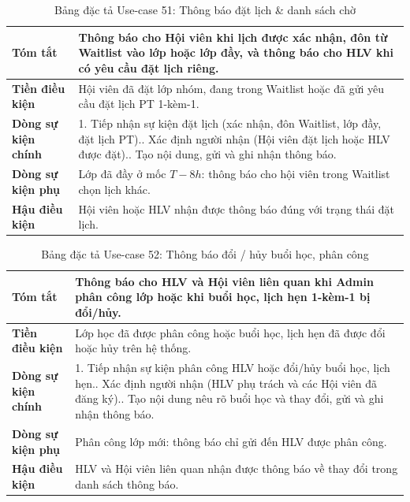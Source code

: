 \documentclass[a4paper,12pt]{article}
\begin{document}
\begin{table}[H]\centering\footnotesize
\begin{tabularx}{\textwidth}{|L{3.2cm}|Y|}
\hline \textbf{Tóm tắt} & Thông báo cho Hội viên khi lịch được xác nhận, đôn từ Waitlist vào lớp hoặc lớp đầy, và thông báo cho HLV khi có yêu cầu đặt lịch riêng. \\ \hline
\textbf{Tiền điều kiện} & Hội viên đã đặt lớp nhóm, đang trong Waitlist hoặc đã gửi yêu cầu đặt lịch PT 1-kèm-1. \\ \hline
\textbf{Dòng sự kiện chính} & 1. Tiếp nhận sự kiện đặt lịch (xác nhận, đôn Waitlist, lớp đầy, đặt lịch PT).. Xác định người nhận (Hội viên đặt lịch hoặc HLV được đặt).. Tạo nội dung, gửi và ghi nhận thông báo. \\ \hline
\textbf{Dòng sự kiện phụ} & Lớp đã đầy ở mốc $T-8h$: thông báo cho hội viên trong Waitlist chọn lịch khác. \\ \hline
\textbf{Hậu điều kiện} & Hội viên hoặc HLV nhận được thông báo đúng với trạng thái đặt lịch. \\ \hline
\end{tabularx}
\caption{Bảng đặc tả Use-case 51: Thông báo đặt lịch \& danh sách chờ}
\end{table}

\begin{table}[H]\centering\footnotesize
\begin{tabularx}{\textwidth}{|L{3.2cm}|Y|}
\hline \textbf{Tóm tắt} & Thông báo cho HLV và Hội viên liên quan khi Admin phân công lớp hoặc khi buổi học, lịch hẹn 1-kèm-1 bị đổi/hủy. \\ \hline
\textbf{Tiền điều kiện} & Lớp học đã được phân công hoặc buổi học, lịch hẹn đã được đổi hoặc hủy trên hệ thống. \\ \hline
\textbf{Dòng sự kiện chính} & 1. Tiếp nhận sự kiện phân công HLV hoặc đổi/hủy buổi học, lịch hẹn.. Xác định người nhận (HLV phụ trách và các Hội viên đã đăng ký).. Tạo nội dung nêu rõ buổi học và thay đổi, gửi và ghi nhận thông báo. \\ \hline
\textbf{Dòng sự kiện phụ} & Phân công lớp mới: thông báo chỉ gửi đến HLV được phân công. \\ \hline
\textbf{Hậu điều kiện} & HLV và Hội viên liên quan nhận được thông báo về thay đổi trong danh sách thông báo. \\ \hline
\end{tabularx}
\caption{Bảng đặc tả Use-case 52: Thông báo đổi / hủy buổi học, phân công}
\end{table}
\end{document}
